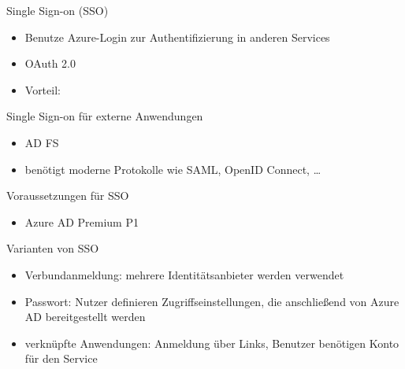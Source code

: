 

\begin{flashcard}[Definition]{Single Sign-on (SSO)}
  \begin{itemize}
    \item Benutze Azure-Login zur Authentifizierung in anderen Services
    \item OAuth 2.0
    \item Vorteil: 
  \end{itemize}
\end{flashcard}

\begin{flashcard}[Definition]{Single Sign-on für externe Anwendungen}
  \begin{itemize}
    \item AD FS
    \item benötigt moderne Protokolle wie SAML, OpenID Connect, \ldots
  \end{itemize}
\end{flashcard}

\begin{flashcard}[Definition]{Voraussetzungen für SSO}
  \begin{itemize}
    \item Azure AD Premium P1
  \end{itemize}
\end{flashcard}

\begin{flashcard}[Definition]{Varianten von SSO}
  \begin{itemize}
    \item Verbundanmeldung: mehrere Identitätsanbieter werden verwendet
    \item Passwort: Nutzer definieren Zugriffseinstellungen, die anschließend von Azure AD bereitgestellt werden
    \item verknüpfte Anwendungen: Anmeldung über Links, Benutzer benötigen Konto für den Service
  \end{itemize}
\end{flashcard}

